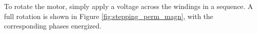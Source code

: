 \newpage
To rotate the motor, simply apply a voltage across the windings in a sequence. A full rotation is shown in Figure \ref{fig:stepping_perm_magn}, with the corresponding phases energized.

\begin{figure}[htp]
    \begin{center}
    \hfill
    \hfill
  	\hfill
    \end{center}
    

\end{figure}
